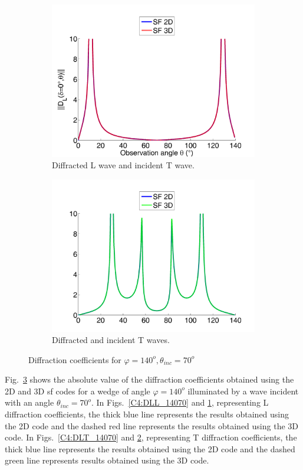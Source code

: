 \begin{figure}
\begin{subfigure}[b]{0.44\textwidth}
        \includegraphics[width=\textwidth]{images/chapter4/XpropL_140_70_0_TH.png}
        \caption{Diffracted L wave and incident T wave.}
        \label{C4:DTL_14070}
    \end{subfigure}
    \begin{subfigure}[b]{0.44\textwidth}
        \includegraphics[width=\textwidth]{images/chapter4/XpropTH_140_70_0_TH.png}
        \caption{Diffracted and incident T waves.}
        \label{C4:DTT_14070}
     \end{subfigure}
     \caption{Diffraction coefficients for $\varphi=140^o, \theta_{inc}=70^o$}
     \label{C4:14070}
\end{figure}

Fig.~\ref{C4:14070} shows the absolute value of the diffraction coefficients obtained using the 2D and 3D \acrshort{sf} codes for a wedge of angle $\varphi=140^o$ illuminated by a wave incident with an angle $\theta_{inc}=70^o$. In Figs.~\ref{C4:DLL_14070} and \ref{C4:DTL_14070}, representing L diffraction coefficients, the thick blue line represents the results obtained using the 2D code and the dashed red line represents the results obtained using the 3D code. In Figs.~\ref{C4:DLT_14070} and \ref{C4:DTT_14070}, representing T diffraction coefficients, the thick blue line represents the results obtained using the 2D code and the dashed green line represents results obtained using the 3D code.


